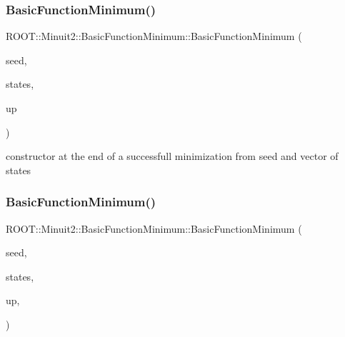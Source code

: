 \mbox{\label{classROOT_1_1Minuit2_1_1BasicFunctionMinimum_a8a2f91243b896e3fe682c19ccd57a9bc}} 
\subsubsection{\texorpdfstring{BasicFunctionMinimum()}{BasicFunctionMinimum()}\hspace{0.1cm}{\footnotesize\ttfamily [12/15]}}
{\footnotesize\ttfamily R\+O\+O\+T\+::\+Minuit2\+::\+Basic\+Function\+Minimum\+::\+Basic\+Function\+Minimum (\begin{DoxyParamCaption}\item[{const \mbox{\hyperlink{classROOT_1_1Minuit2_1_1MinimumSeed}{Minimum\+Seed}} \&}]{seed,  }\item[{const std\+::vector$<$ \mbox{\hyperlink{classROOT_1_1Minuit2_1_1MinimumState}{Minimum\+State}} $>$ \&}]{states,  }\item[{double}]{up }\end{DoxyParamCaption})\hspace{0.3cm}{\ttfamily [inline]}}



constructor at the end of a successfull minimization from seed and vector of states 

\mbox{\label{classROOT_1_1Minuit2_1_1BasicFunctionMinimum_a2a15d2336acfb9f3be41de8e477c191a}} 
\subsubsection{\texorpdfstring{BasicFunctionMinimum()}{BasicFunctionMinimum()}\hspace{0.1cm}{\footnotesize\ttfamily [13/15]}}
{\footnotesize\ttfamily R\+O\+O\+T\+::\+Minuit2\+::\+Basic\+Function\+Minimum\+::\+Basic\+Function\+Minimum (\begin{DoxyParamCaption}\item[{const \mbox{\hyperlink{classROOT_1_1Minuit2_1_1MinimumSeed}{Minimum\+Seed}} \&}]{seed,  }\item[{const std\+::vector$<$ \mbox{\hyperlink{classROOT_1_1Minuit2_1_1MinimumState}{Minimum\+State}} $>$ \&}]{states,  }\item[{double}]{up,  }\item[{\mbox{\hyperlink{classROOT_1_1Minuit2_1_1BasicFunctionMinimum_1_1MnReachedCallLimit}{Mn\+Reached\+Call\+Limit}}}]{ }\end{DoxyParamCaption})\hspace{0.3cm}{\ttfamily [inline]}}



